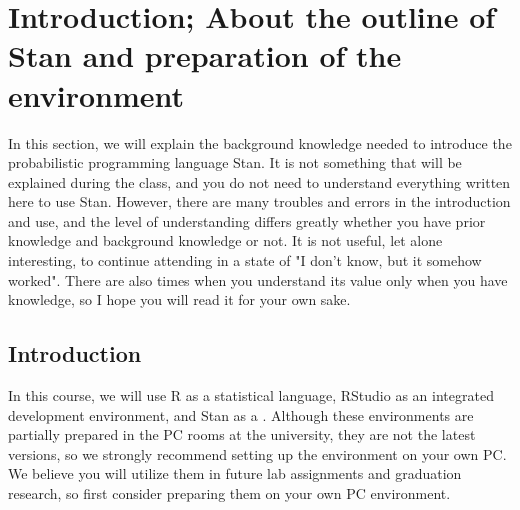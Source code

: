 \documentclass{ltjsbook}
\begin{document}
\VerbatimFootnotes
\chapter{Introduction; About the outline of Stan and preparation of the environment}
\label{PrepareStan}

In this section, we will explain the background knowledge needed to introduce the probabilistic programming language Stan. It is not something that will be explained during the class, and you do not need to understand everything written here to use Stan. However, there are many troubles and errors in the introduction and use, and the level of understanding differs greatly whether you have prior knowledge and background knowledge or not. It is not useful, let alone interesting, to continue attending in a state of "I don't know, but it somehow worked". There are also times when you understand its value only when you have knowledge, so I hope you will read it for your own sake.


\section{Introduction}
In this course, we will use R as a statistical language, RStudio as an integrated development environment, and Stan as a . Although these environments are partially prepared in the PC rooms at the university, they are not the latest versions, so we strongly recommend setting up the environment on your own PC. We believe you will utilize them in future lab assignments and graduation research, so first consider preparing them on your own PC environment.
\end{document}
